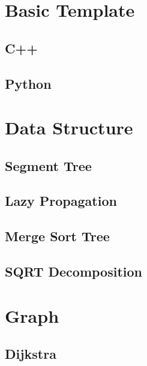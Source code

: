 \documentclass[10pt,landscape,a4paper,twocolumn]{article}
\begin{document}
\tableofcontents

\section{Basic Template}

\subsection{C++}


\subsection{Python}


\section{Data Structure}

\subsection{Segment Tree}


\subsection{Lazy Propagation}


\subsection{Merge Sort Tree}


\subsection{SQRT Decomposition}


\section{Graph}

\subsection{Dijkstra}

\end{document}
